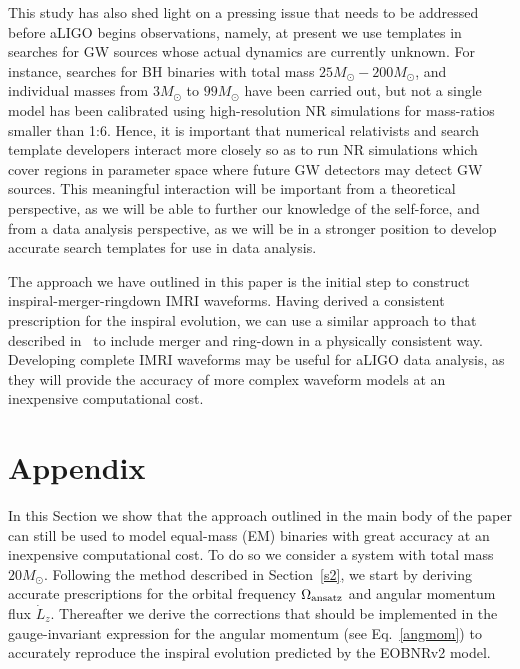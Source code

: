 This study has also shed light on  a pressing issue that needs to be addressed before aLIGO begins observations, namely, at present we use templates  in searches for GW sources  whose actual dynamics are currently unknown. For instance, searches for BH binaries with total mass  \(25M_{\odot} - 200M_{\odot}\), and individual masses from \(3M_{\odot}\) to \(99M_{\odot}\) have been carried out, but not a single model has been calibrated using high-resolution NR simulations for mass-ratios smaller than 1:6. Hence, it is important that numerical relativists and search template developers interact more closely so as to run NR simulations which cover regions in parameter space where future GW detectors may detect GW sources. This meaningful interaction will be important from a theoretical perspective, as we will be able to further our knowledge of the self-force, and from a data analysis perspective, as we will be in a stronger position to develop accurate search templates for use in data analysis. 

The approach we have outlined in this paper is the initial step to construct inspiral-merger-ringdown IMRI waveforms. Having derived a consistent prescription for the inspiral evolution, we can use a similar approach to that described in~\cite{ori,firstpaper} to include merger and ring-down in a physically consistent way. Developing complete IMRI waveforms may be useful for aLIGO data analysis, as they will provide the accuracy of more complex waveform models at an inexpensive computational cost.  
  
\section{Appendix}

In this Section we show that the approach outlined in the main body of the paper can still be used to model equal-mass (EM) binaries with great accuracy at an inexpensive computational cost. To do so we consider a system with total mass \(20 M_{\odot}\). Following the method described in Section~\ref{s2}, we start by deriving accurate prescriptions for the orbital frequency \(\Omega_{\rm ansatz}\) and angular momentum flux \(\dot{L}_z\). Thereafter we derive the corrections that should be implemented in the gauge-invariant expression for the angular momentum (see Eq.~\eqref{angmom}) to accurately reproduce the inspiral evolution predicted by the EOBNRv2 model. 

